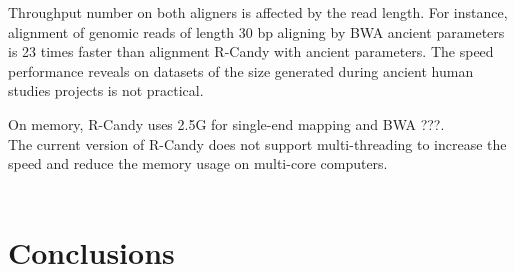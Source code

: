 \documentclass[11pt,a4paper]{report}
\begin{document}
Throughput number on both aligners is affected by the read length.
For instance, alignment of genomic reads of length 30 bp aligning
by BWA ancient parameters is 23 times faster than alignment R-Candy
with ancient parameters.
The speed performance reveals on datasets of the size generated 
during ancient human studies projects is not practical.


On memory, R-Candy uses 2.5G for single-end mapping and BWA ???.\\

The current version of R-Candy does not support multi-threading 
to increase the speed and reduce the memory usage on multi-core 
computers.\\\\









\section{Conclusions} \label{Conclusions}
\end{document}
